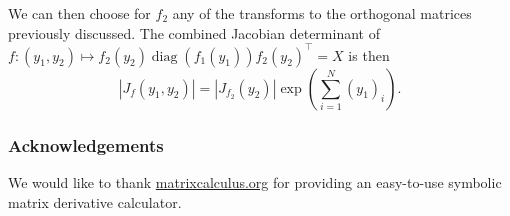 \documentclass[11pt]{article}
\newcommand{\abs}[1]{\left| #1 \right|}
\newcommand{\absdet}[1]{\abs{#1}}
\begin{document}
We can then choose for $f_2$ any of the transforms to the orthogonal matrices previously discussed.
The combined Jacobian determinant of $f: (y_1, y_2) \mapsto f_2(y_2) \operatorname{diag}(f_1(y_1)) f_2(y_2)^\top = X$ is then 
\[ \absdet{J_{f}(y_1, y_2)} = \absdet{J_{f_2}(y_2)} \exp\left(\sum_{i=1}^N (y_1)_i\right).\]

\subsubsection*{Acknowledgements}

We would like to thank \url{matrixcalculus.org} for providing an
easy-to-use symbolic matrix derivative calculator.



{}

\end{document}

